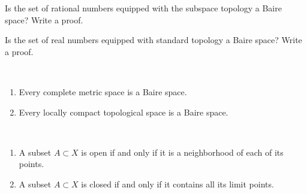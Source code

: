 \begin{ex}\label{Ex:3}
    Is the set of rational numbers equipped with the subspace topology a Baire space? Write a proof. 
\end{ex}

\begin{ex}\label{Ex:4} 
Is the set of real numbers equipped with standard topology a Baire space? Write a proof. 
\end{ex}
\begin{theorem}
\

\begin{enumerate}
\item Every complete metric space is a Baire space.
\item Every locally compact topological space is a Baire space.
\end{enumerate}
\end{theorem}

\begin{theorem}
\

\begin{enumerate}
\item A subset $A \subset X$ is open if and only if it is a neighborhood of each of its points.

\item A subset $A \subset X$ is closed if and only if it contains all its limit points.
\end{enumerate}
\end{theorem}
 
